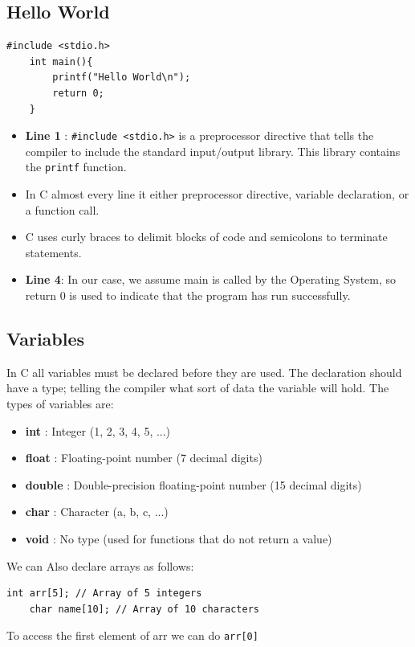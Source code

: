 \documentclass[a4paper, 10pt]{article}
\begin{document}
\subsection{Hello World}
\begin{lstlisting}[style=cStyle, caption={Hello World in C}]
    #include <stdio.h>
    int main(){
        printf("Hello World\n");
        return 0;
    }
    \end{lstlisting}
\begin{itemize}
    \item \textbf{Line 1} : \texttt{\#include <stdio.h>} is a preprocessor directive that tells the compiler to include the standard input/output library. This library contains the \texttt{printf} function.
    \item In C almost every line it either preprocessor directive, variable declaration, or a function call.
    \item C uses curly braces to delimit blocks of code and semicolons to terminate statements.
    \item \textbf{Line 4}: In our case, we assume main is called by the Operating System, so return 0 is used to indicate that the program has run successfully.
\end{itemize}

\subsection{Variables}
In C all variables must be declared before they are used. The declaration should have a type; telling the compiler what sort of data the variable will hold. The types of variables are:
\begin{itemize}
    \item \textbf{int} : Integer (1, 2, 3, 4, 5, ...)
    \item \textbf{float} : Floating-point number (7 decimal digits)
    \item \textbf{double} : Double-precision floating-point number (15 decimal digits)
    \item \textbf{char} : Character (a, b, c, ...)
    \item \textbf{void} : No type  (used for functions that do not return a value)
\end{itemize}

We can Also declare arrays as follows:
\begin{lstlisting}[style=cStyle, caption={Declaring Arrays}]
    int arr[5]; // Array of 5 integers
    char name[10]; // Array of 10 characters
\end{lstlisting}
To access the first element of arr we can do \texttt{arr[0]}
\end{document}

